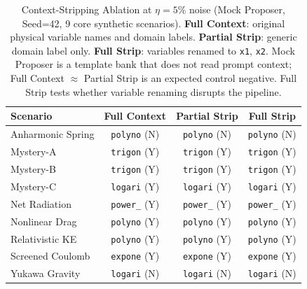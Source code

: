 \begin{table}[H]
\centering\footnotesize
\caption{Context-Stripping Ablation at $\eta=5\%$ noise (Mock Proposer, Seed=42, 9 core synthetic scenarios). \textbf{Full Context}: original physical variable names and domain labels. \textbf{Partial Strip}: generic domain label only. \textbf{Full Strip}: variables renamed to \texttt{x1}, \texttt{x2}. Mock Proposer is a template bank that does not read prompt context; Full Context $\approx$ Partial Strip is an expected control negative. Full Strip tests whether variable renaming disrupts the pipeline.}
\label{tab:context_strip_ablation}
\begin{tabular}{l c c c}
\toprule
\textbf{Scenario} & \textbf{Full Context} & \textbf{Partial Strip} & \textbf{Full Strip} \\
\midrule
Anharmonic Spring & \texttt{polyno} (N) & \texttt{polyno} (N) & \texttt{polyno} (N) \\
Mystery-A & \texttt{trigon} (Y) & \texttt{trigon} (Y) & \texttt{trigon} (Y) \\
Mystery-B & \texttt{trigon} (Y) & \texttt{trigon} (Y) & \texttt{trigon} (Y) \\
Mystery-C & \texttt{logari} (Y) & \texttt{logari} (Y) & \texttt{logari} (Y) \\
Net Radiation & \texttt{power_} (Y) & \texttt{power_} (Y) & \texttt{power_} (Y) \\
Nonlinear Drag & \texttt{polyno} (Y) & \texttt{polyno} (Y) & \texttt{polyno} (Y) \\
Relativistic KE & \texttt{polyno} (Y) & \texttt{polyno} (Y) & \texttt{polyno} (Y) \\
Screened Coulomb & \texttt{expone} (Y) & \texttt{expone} (Y) & \texttt{expone} (Y) \\
Yukawa Gravity & \texttt{logari} (N) & \texttt{logari} (N) & \texttt{logari} (N) \\
\bottomrule
\end{tabular}
\end{table}
